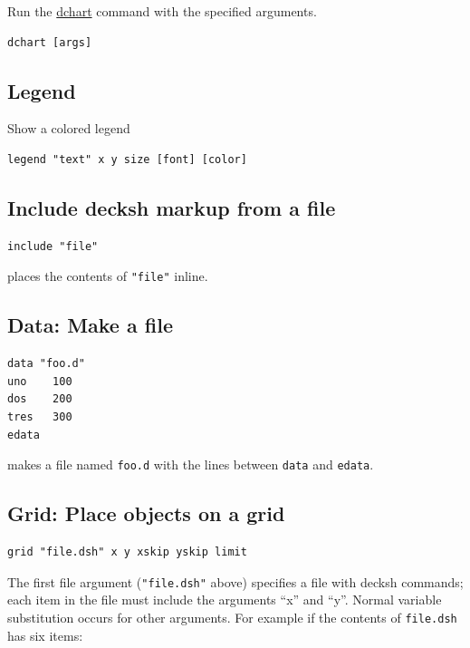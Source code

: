 Run the
\href{https://github.com/ajstarks/dchart/blob/master/README.md}{dchart}
command with the specified arguments.

\begin{verbatim}
dchart [args]
\end{verbatim}

\hypertarget{legend}{%
\subsection{Legend}\label{legend}}

Show a colored legend

\begin{verbatim}
legend "text" x y size [font] [color]
\end{verbatim}

\hypertarget{include-decksh-markup-from-a-file}{%
\subsection{Include decksh markup from a
file}\label{include-decksh-markup-from-a-file}}

\begin{verbatim}
include "file"
\end{verbatim}

places the contents of \texttt{"file"} inline.

\hypertarget{data-make-a-file}{%
\subsection{Data: Make a file}\label{data-make-a-file}}

\begin{verbatim}
data "foo.d"
uno    100
dos    200
tres   300
edata
\end{verbatim}

makes a file named \texttt{foo.d} with the lines between \texttt{data}
and \texttt{edata}.

\hypertarget{grid-place-objects-on-a-grid}{%
\subsection{Grid: Place objects on a
grid}\label{grid-place-objects-on-a-grid}}

\begin{verbatim}
grid "file.dsh" x y xskip yskip limit
\end{verbatim}

The first file argument (\texttt{"file.dsh"} above) specifies a file
with decksh commands; each item in the file must include the arguments
``x'' and ``y''. Normal variable substitution occurs for other
arguments. For example if the contents of \texttt{file.dsh} has six
items:


